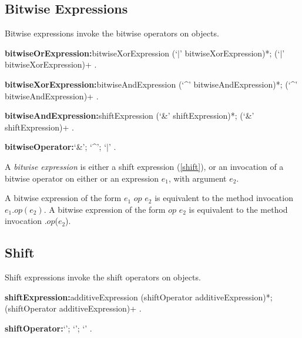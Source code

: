 \documentclass{article}
\newcommand{\code}[1]{{\sf #1}}
\begin{document}
\subsection{ Bitwise Expressions}

\LMHash{}
Bitwise expressions invoke the bitwise operators on objects.

 \begin{grammar}
{\bf bitwiseOrExpression:}bitwiseXorExpression (`$|$' bitwiseXorExpression)*;
      \SUPER{} (`$|$' bitwiseXorExpression)+
    .

{\bf bitwiseXorExpression:}bitwiseAndExpression (`\^{}' bitwiseAndExpression)*;
      \SUPER{} (`\^{}' bitwiseAndExpression)+
    .

{\bf bitwiseAndExpression:}shiftExpression (`\&' shiftExpression)*;
      \SUPER{} (`\&' shiftExpression)+
    .

{\bf bitwiseOperator:}`\&';
      `\^{}';
      `$|$'
    .
 \end{grammar}

\LMHash{}
A {\em bitwise expression} is either a shift expression (\ref{shift}), or an invocation of a bitwise operator on either \SUPER{} or an expression $e_1$, with argument $e_2$.

\LMHash{}
A bitwise expression of the form \code{$e_1$ $op$ $e_2$} is equivalent to the method invocation $e_1.op(e_2)$.
A bitwise expression of the form \code{\SUPER{} $op$ $e_2$} is equivalent to the method invocation \code{\SUPER{}.$op$($e_2$)}.



\subsection{ Shift}

\LMHash{}
Shift expressions invoke the shift operators on objects.

 \begin{grammar}
{\bf shiftExpression:}additiveExpression (shiftOperator additiveExpression)*;
      \SUPER{} (shiftOperator additiveExpression)+
    .

{\bf shiftOperator:}`{\escapegrammar \lt\lt'};
       `{\escapegrammar \gt \gt}';
       `{\escapegrammar \gt \gt \gt}'
    .
 \end{grammar}
\end{document}
